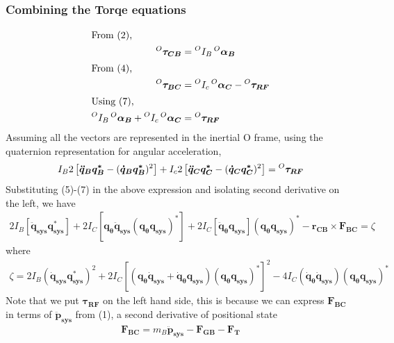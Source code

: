 \subsubsection{Combining the Torqe equations}
\begin{align*}
  \shortintertext{From (2),}
  \prescript{O}{}{\bm{\tau_{CB}}} &= \prescript{O}{}{I_B} \prescript{O}{}{\bm{\alpha_B}} \\
  \shortintertext{From (4),}
  \prescript{O}{}{\bm{\tau_{BC}}} &= \prescript{O}{}{I_c} \prescript{O}{}{\bm{\alpha_C}} - \prescript{O}{}{\bm{\tau_{RF}}}  \\
  \shortintertext{Using (7),}
  \prescript{O}{}{I_B} \prescript{O}{}{\bm{\alpha_B}} + \prescript{O}{}{I_c} \prescript{O}{}{\bm{\alpha_C}} &= \prescript{O}{}{\bm{\tau_{RF}}} \\
\end{align*}  
Assuming all the vectors are represented in the inertial O frame, using the quaternion representation for angular acceleration,
\begin{equation}
  I_B 2\left[\bm{\ddot{q}_B}\bm{q_B^*} - (\bm{\dot{q}_B} \bm{q_B^*})^2\right] + I_c 2 \left[\bm{\ddot{q}_C}\bm{q_C^*} - (\bm{\dot{q}_C} \bm{q_C^*})^2\right] = \prescript{O}{}{\bm{\tau_{RF}}}
\end{equation}
Substituting (5)-(7) in the above expression and isolating second derivative on the left, we have
\begin{align}
  2 I_B [\bm{\ddot{q}_{sys}} \bm{q_{sys}^*}] + 2I_C [\bm{q_{\theta}}\bm{\ddot{q}_{sys}} (\bm{q_{\theta}} \bm{q_{sys}})^{\bm{*}}] + 2 I_C [\bm{\ddot{q}_{\theta}} \bm{q_{sys}}](\bm{q_{\theta}q_{sys}})^{\bm{*}} - \bm{r_{CB}} \times \bm{F_{BC}} = \zeta
\end{align}
where
\begin{align*}
  \zeta = 2I_B(\bm{\dot{q}_{sys}}\bm{q_{sys}^*})^2 + 2I_C[(\bm{q_\theta} \bm{\dot{q}_{sys}} + \bm{\dot{q}_\theta}\bm{q_{sys}})(\bm{q_{\theta}\bm{q_{sys}}})^{\bm{*}}]^2 - 4I_C(\bm{\dot{q}_{\theta}\dot{q}_{sys}} )(\bm{q_\theta q_{sys}})^{\bm{*}}
\end{align*}
Note that we put $\bm{\tau_{RF}}$ on the left hand side, this is because we can express $\bm{F_{BC}}$ in terms of $\bm{\ddot{p}_{sys}}$ from (1), a second derivative of positional state
\begin{align*}
  \bm{F_{BC}} = m_B \bm{\ddot{p}_{sys}} - \bm{F_{GB}} - \bm{F_{T}}
\end{align*}

